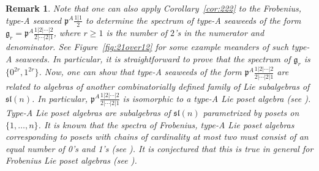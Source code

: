 \documentclass[letterpaper,10pt]{article}
\newtheorem{remark}[theorem]{Remark}
\begin{document}
\begin{remark}\label{rem:posets}
Note that one can also apply Corollary~\ref{cor:222} to the Frobenius, type-A seaweed $\mathfrak{p}^A\frac{1|1}{2}$ to determine the spectrum of type-A seaweeds of the form $\mathfrak{g}_r=\mathfrak{p}^A\frac{1|2|\cdots|2}{2|\cdots|2|1}$, where $r\geq 1$ is the number of $2$'s in the numerator and denominator. See Figure~\ref{fig:21over12} for some example meanders of such type-A seaweeds. In particular, it is straightforward to prove that the spectrum of $\mathfrak{g}_r$ is $\{0^{2r},1^{2r}\}$. Now, one can show that type-A seaweeds of the form $\mathfrak{p}^A\frac{1|2|\cdots|2}{2|\cdots|2|1}$ are related to algebras of another combinatorially defined family of Lie subalgebras of $\mathfrak{sl}(n)$. In particular, $\mathfrak{p}^A\frac{1|2|\cdots|2}{2|\cdots|2|1}$ is isomorphic to a type-A Lie poset algebra \textup(see \textup{\textbf{\cite{seriesA}}}\textup). Type-A Lie poset algebras are subalgebras of $\mathfrak{sl}(n)$ parametrized by posets on $\{1,\hdots,n\}$. It is known that the spectra of Frobenius, type-A Lie poset algebras corresponding to posets with chains of cardinality at most two must consist of an equal number of 0's and 1's \textup(see \textup{\textbf{\cite{Binary}}}\textup). It is conjectured that this is true in general for Frobenius Lie poset algebras \textup(see \textup{\textbf{\cite{Binary,BCD}}}\textup).
\end{remark}
\end{document}
